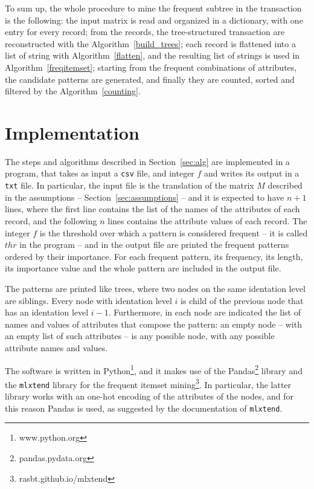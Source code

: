 \documentclass{acm_proc_article-sp-sigmod09}
\begin{document}
To sum up, the whole procedure to mine the frequent subtree in the transaction is the following: the input matrix is read and organized in a dictionary, with one entry for every record; from the records, the tree-structured transaction are reconstructed with the Algorithm~\ref{build_trees}; each record is flattened into a list of string with Algorithm~\ref{flatten}, and the resulting list of strings is used in Algorithm~\ref{freqitemset}; starting from the frequent combinations of attributes, the candidate patterns are generated, and finally they are counted, sorted and filtered by the Algorithm~\ref{counting}.

\section{Implementation}
The steps and algorithms described in Section~\ref{sec:alg} are implemented in a program, that takes as input a \texttt{csv} file, and integer $f$ and writes its output in a \texttt{txt} file. In particular, the input file is the translation of the matrix $M$ described in the assumptions -- Section~\ref{sec:assumptions} -- and it is expected to have $n + 1$ lines, where the first line contains the list of the names of the attributes of each record, and the following $n$ lines contains the attribute values of each record. The integer $f$ is the threshold over which a pattern is considered frequent -- it is called $thr$ in the program -- and in the output file are printed the frequent patterns ordered by their importance. For each frequent pattern, its frequency, its length, its importance value and the whole pattern are included in the output file. 

The patterns are printed like trees, where two nodes on the same identation level are siblings. Every node with identation level $i$ is child of the previous node that has an identation level $i - 1$. Furthermore, in each node are indicated the list of names and values of attributes that compose the pattern: an empty node -- with an empty list of such attributes -- is any possible node, with any possible attribute names and values.

The software is written in Python\footnote{www.python.org}, and it makes use of the Pandas\footnote{pandas.pydata.org} library \cite{mckinney2010data} and the \texttt{mlxtend} library for the frequent itemset mining\footnote{rasbt.github.io/mlxtend}. In particular, the latter library works with an one-hot encoding of the attributes of the nodes, and for this reason Pandas is used, as suggested by the documentation of \texttt{mlxtend}.
\end{document}
